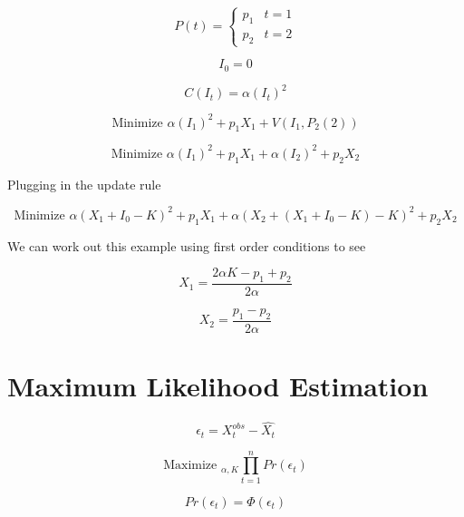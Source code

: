 \documentclass{article}
\begin{document}
\[ 
P(t) =
\begin{cases}
p_1 & t = 1 \\ 
p_2 & t = 2
\end{cases} 
\]

$$I_0 = 0$$

$$ C(I_t) = \alpha (I_t)^2$$

$$\text{Minimize }  \alpha (I_1)^2 + p_1 X_1 +  V(I_1,P_2(2)) $$


$$\text{Minimize }  \alpha (I_1)^2 + p_1 X_1 +  \alpha (I_2)^2 + p_2 X_2 $$

Plugging in the update rule

$$\text{Minimize }  \alpha (X_1 + I_0 - K )^2 + p_1 X_1 +  \alpha (X_2 + (X_1 + I_0 - K)  - K )^2 + p_2 X_2 $$

We can work out this example using first order conditions to see

$$X_1 = \frac {2\alpha K - p_1 + p_2}{2 \alpha } $$

$$X_2 = \frac {p_1 - p_2}{2 \alpha } $$


\section{Maximum Likelihood Estimation}

$$\epsilon_t = X_t^{obs}- \hat{X_t}$$

$$ \text{Maximize }_{\alpha, K} \prod_{t=1}^{n} Pr(\epsilon_t)$$

$$Pr(\epsilon_t) = \Phi( \epsilon_t )$$
\end{document}
